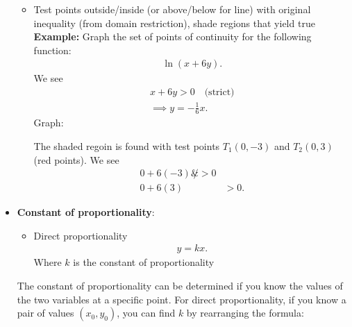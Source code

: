 \documentclass{report}
\begin{document}
\begin{itemize}
\begin{itemize}
                    \item Test points outside/inside (or above/below for line) with original inequality (from domain restriction), shade regions that yield true
                        \bigbreak \noindent 
                        \textbf{Example:} Graph the set of points of continuity for the following function:
                        \begin{align*}
                            \ln{(x+6y)}
                        .\end{align*}
                        We see 
                        \begin{align*}
                            x+6y > 0  \quad \text{(strict)}\\
                            \implies y = -\frac{1}{6}x
                        .\end{align*}
                        Graph:
                    \begin{figure}[ht]
                        \centering
                        \label{fig:graphermane1233}
                    \end{figure}
                    \bigbreak \noindent 
                    The shaded regoin is found with test points $T_{1}(0,-3)$ and $T_{2}(0,3)$ (red points). We see
                    \begin{align*}
                        0 + 6(-3) \not&> 0 \\
                        0 + 6(3) &> 0 
                    .\end{align*}
                \end{itemize}
            \item \textbf{Constant of proportionality}:
                \begin{itemize}
                    \item Direct proportionality
                        \begin{align*}
                            y = kx
                        .\end{align*}
                        Where $k$ is the constant of proportionality
                \end{itemize}
                The constant of proportionality can be determined if you know the values of the two variables at a specific point. For direct proportionality, if you know a pair of values $(x_{0}, y_{0}) $, you can find  $k$ by rearranging the formula:
                \begin{align*}

\end{align*}
\end{itemize}
\end{document}
